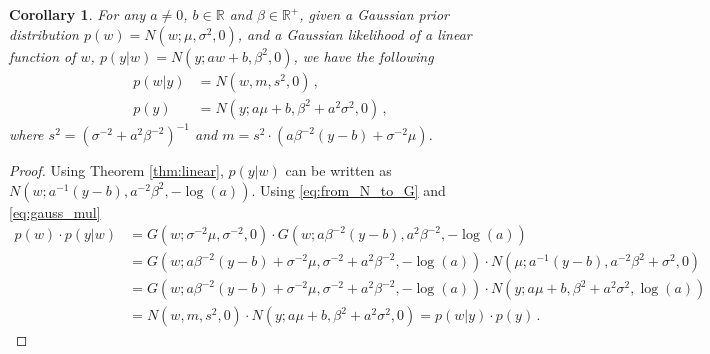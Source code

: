 \documentclass[a4paper]{article}
\newtheorem{cor}{Corollary}
\begin{document}
\begin{cor}
    For any $a \not= 0$, $b \in \mathbb{R}$ and $\beta \in \mathbb{R}^+$, given a Gaussian prior distribution $p(w) = N(w;\mu,\sigma^2,0)$, and a Gaussian likelihood of a linear function of $w$, $p(y|w) = N(y;aw + b,\beta^2,0)$, we have the following
    \begin{align}
        p(w|y) & = N\left(w,m,s^2,0\right)\,,                           \\
        p(y)   & = N\left(y;a\mu + b,\beta^2 + a^2\sigma^2,0\right) \,,
    \end{align}
    where $s^2 = \left(\sigma^{-2} + a^{2}\beta^{-2}\right)^{-1}$ and $m=s^2\cdot\left(a\beta^{-2}(y-b)+\sigma^{-2}\mu\right)$.
\end{cor}

\begin{proof}
    Using Theorem \ref{thm:linear}, $p(y|w)$ can be written as $N\left(w;a^{-1}(y - b), a^{-2}\beta^2,-\log(a)\right)$. Using \eqref{eq:from_N_to_G} and \eqref{eq:gauss_mul}
    \begin{align*}
        p(w) \cdot p(y|w) & = G\left(w;\sigma^{-2}\mu,\sigma^{-2},0\right) \cdot G\left(w;a\beta^{-2}(y - b), a^2\beta^{-2},-\log(a)\right)                                                \\
                          & = G\left(w;a\beta^{-2}(y - b) + \sigma^{-2}\mu,\sigma^{-2} + a^2\beta^{-2},-\log(a)\right) \cdot N\left(\mu;a^{-1}(y - b),a^{-2}\beta^2 + \sigma^{2},0 \right) \\
                          & = G\left(w;a\beta^{-2}(y - b) + \sigma^{-2}\mu,\sigma^{-2} + a^2\beta^{-2},-\log(a)\right) \cdot N\left(y;a\mu + b,\beta^2 + a^2\sigma^{2},\log(a)\right)      \\
                          & = N\left(w,m,s^2,0\right) \cdot N\left(y;a\mu + b,\beta^2 + a^2\sigma^2,0\right) = p(w|y) \cdot p(y) \,.
    \end{align*}
\end{proof}
\end{document}
